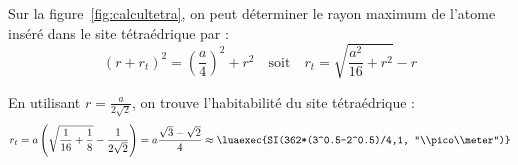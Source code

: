 \documentclass{cours}
\begin{document}
Sur la figure~\ref{fig:calcultetra}, on peut déterminer le rayon maximum de l'atome inséré dans le site tétraédrique par :
\begin{equation}
  (r+r_t)^2 = \left( \frac{a}{4} \right) ^2 + r^2 \quad \text{soit} \quad r_t = \sqrt{\frac{a^2}{16}+ r^2}-r
\end{equation}

En utilisant $r=\frac{a}{2 \sqrt{2}}$, on trouve l'habitabilité du site tétraédrique :
\begin{equation}
  r_t = a \left( \sqrt{\frac{1}{16}+\frac{1}{8}} - \frac{1}{2 \sqrt{2}} \right)  = a \frac{\sqrt{3}-\sqrt{2}}{4} \approx \luaexec{SI(362*(3^0.5-2^0.5)/4,1, "\\pico\\meter")} 
\end{equation}
\end{document}
